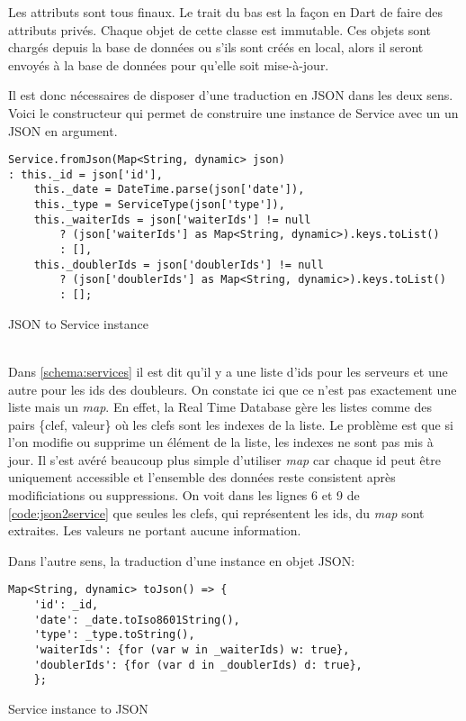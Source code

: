 Les attributs sont tous finaux. Le trait du bas est la façon en Dart de faire des attributs privés. Chaque objet de cette classe est immutable. Ces objets sont chargés depuis la base de données ou s'ils sont créés en local, alors il seront envoyés à la base de données pour qu'elle soit mise-à-jour. 

Il est donc nécessaires de disposer d'une traduction en JSON dans les deux sens. Voici le constructeur qui permet de construire une instance de Service avec un un JSON en argument.\\
\begin{listing}[!h]
\begin{verbatim}
Service.fromJson(Map<String, dynamic> json)
: this._id = json['id'],
    this._date = DateTime.parse(json['date']),
    this._type = ServiceType(json['type']),
    this._waiterIds = json['waiterIds'] != null
        ? (json['waiterIds'] as Map<String, dynamic>).keys.toList()
        : [],
    this._doublerIds = json['doublerIds'] != null
        ? (json['doublerIds'] as Map<String, dynamic>).keys.toList()
        : [];
\end{verbatim}
\caption{JSON to Service instance}
\label{code:json2service}
\end{listing}\\
Dans \autoref{schema:services} il est dit qu'il y a une liste d'ids pour les serveurs et une autre pour les ids des doubleurs. On constate ici que ce n'est pas exactement une liste mais un \textit{map}. En effet, la Real Time Database gère les listes comme des pairs \{clef, valeur\} où les clefs sont les indexes de la liste. Le problème est que si l'on modifie ou supprime un élément de la liste, les indexes ne sont pas mis à jour. Il s'est avéré beaucoup plus simple d'utiliser \textit{map} car chaque id peut être uniquement accessible et l'ensemble des données reste consistent après modificiations ou suppressions. On voit dans les lignes 6 et 9 de \autoref{code:json2service} que seules les clefs, qui représentent les ids, du \textit{map} sont extraites. Les valeurs ne portant aucune information. 

Dans l'autre sens, la traduction d'une instance en objet JSON:

\begin{listing}[!h]
\begin{verbatim}
Map<String, dynamic> toJson() => {
    'id': _id,
    'date': _date.toIso8601String(),
    'type': _type.toString(),
    'waiterIds': {for (var w in _waiterIds) w: true},
    'doublerIds': {for (var d in _doublerIds) d: true},
    };
\end{verbatim}
\caption{Service instance to JSON}
\label{code:service2json}
\end{listing}

